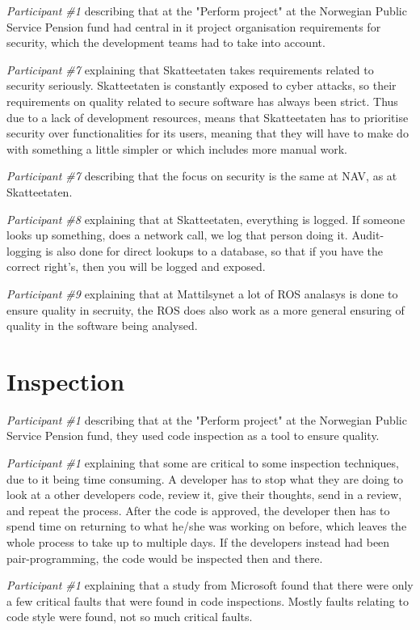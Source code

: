 \textit{Participant \#1} describing that at the "Perform project" at the Norwegian Public Service Pension fund had central in it project organisation requirements for security, which the development teams had to take into account.

\textit{Participant \#7} explaining that Skatteetaten takes requirements related to security seriously. Skatteetaten is constantly exposed to cyber attacks, so their requirements on quality related to secure software has always been strict. Thus due to a lack of development resources, means that Skatteetaten has to prioritise security over functionalities for its users, meaning that they will have to make do with something a little simpler or which includes more manual work.

\textit{Participant \#7} describing that the focus on security is the same at NAV, as at Skatteetaten.

\textit{Participant \#8} explaining that at Skatteetaten, everything is logged. If someone looks up something, does a network call, we log that person doing it. Audit-logging is also done for direct lookups to a database, so that if you have the correct right's, then you will be logged and exposed.

\textit{Participant \#9} explaining that at Mattilsynet a lot of ROS analasys is done to ensure quality in secruity, the ROS does also work as a more general ensuring of quality in the software being analysed.

\section{Inspection}
\textit{Participant \#1} describing that at the "Perform project" at the Norwegian Public Service Pension fund, they used code inspection as a tool to ensure quality.

\textit{Participant \#1} explaining that some are critical to some inspection techniques, due to it being time consuming. A developer has to stop what they are doing to look at a other developers code, review it, give their thoughts, send in a review, and repeat the process. After the code is approved, the developer then has to spend time on returning to what he/she was working on before, which leaves the whole process to take up to multiple days. If the developers instead had been pair-programming, the code would be inspected then and there.

\textit{Participant \#1} explaining that a study from Microsoft found that there were only a few critical faults that were found in code inspections. Mostly faults relating to code style were found, not so much critical faults.

